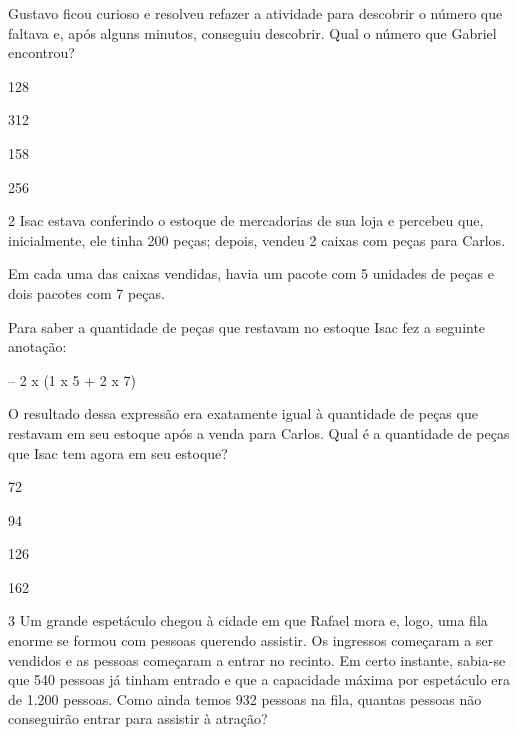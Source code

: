 Gustavo ficou curioso e resolveu refazer a atividade para descobrir o
número que faltava e, após alguns minutos, conseguiu descobrir. Qual o número que Gabriel encontrou?\medskip

\begin{minipage}{.5\textwidth}
\begin{escolha}
\item
  128
\item
  312
\item
  158
\item
  256
\end{escolha}
\end{minipage}

\num{2} Isac estava conferindo o estoque de mercadorias de sua loja e
percebeu que, inicialmente, ele tinha 200 peças; depois, vendeu 2 caixas com peças para Carlos.

Em cada uma das caixas vendidas, havia um pacote com 5 unidades de peças e dois
pacotes com 7 peças.

Para saber a quantidade de peças que restavam no estoque Isac fez a
seguinte anotação:

\begin{mdframed}[linewidth=2pt,linecolor=salmao,backgroundcolor=salmao!20]
 – 2 x (1 x 5 + 2 x 7)
\end{mdframed}

O resultado dessa expressão era exatamente igual à quantidade de peças
que restavam em seu estoque após a venda para Carlos. Qual é a
quantidade de peças que Isac tem agora em seu estoque?\medskip

\begin{minipage}{.5\textwidth}
\begin{escolha}
\item
  72
\item
  94
\item
  126
\item
  162
\end{escolha}
\end{minipage}


\num{3} Um grande espetáculo chegou à cidade em que Rafael mora e, logo, uma fila
enorme se formou com pessoas querendo assistir. Os
ingressos começaram a ser vendidos e as pessoas começaram a entrar no
recinto. Em certo instante, sabia-se que 540 pessoas já tinham
entrado e que a capacidade máxima por espetáculo era de 1.200 pessoas. Como ainda temos 932 pessoas na fila, quantas pessoas não
conseguirão entrar para assistir à atração?\medskip

